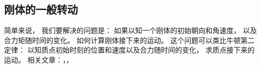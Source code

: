 

\begin{issues}
\issueDraft
\end{issues}


\subsection{刚体的一般转动}
简单来说， 我们要解决的问题是： 如果以知一个刚体的初始朝向和角速度， 以及合力矩随时间的变化。 如何计算刚体接下来的运动。 这个问题可以类比牛顿第二定律： 以知质点初始时刻的位置和速度以及合力随时间的变化， 求质点接下来的运动。 相关文章：，，
